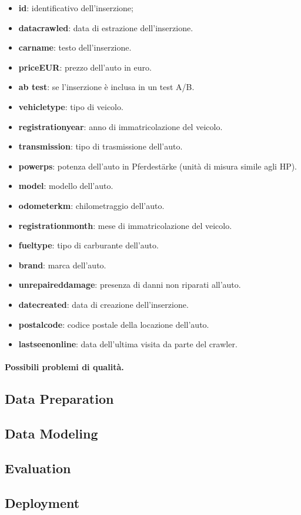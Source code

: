 \begin{itemize}
    \item \textbf{id}: identificativo dell'inserzione;
    \item \textbf{data\textunderscore crawled}: data di estrazione dell'inserzione.
    \item \textbf{car\textunderscore name}: testo dell'inserzione.
    \item \textbf{price\textunderscore EUR}: prezzo dell'auto in euro.
    \item \textbf{ab \textunderscore test}: se l'inserzione è inclusa in un test A/B.
    \item \textbf{vehicle\textunderscore type}: tipo di veicolo.
    \item \textbf{registration\textunderscore year}: anno di immatricolazione del veicolo.
    \item \textbf{transmission}: tipo di trasmissione dell'auto.
    \item \textbf{power\textunderscore ps}: potenza dell'auto in Pferdestärke (unità di misura simile agli HP).
    \item \textbf{model}: modello dell'auto. 
    \item \textbf{odometer\textunderscore km}: chilometraggio dell'auto.
    \item\textbf{registration\textunderscore month}: mese di immatricolazione del veicolo.
    \item \textbf{fuel\textunderscore type}: tipo di carburante dell'auto.
    \item \textbf{brand}: marca dell'auto.
    \item \textbf{unrepaired\textunderscore damage}: presenza di danni non riparati all'auto.
    \item \textbf{date\textunderscore created}: data di creazione dell'inserzione.
    \item \textbf{postal\textunderscore code}: codice postale della locazione dell'auto.
    \item \textbf{last\textunderscore seen\textunderscore online}: data dell'ultima visita da parte del crawler.
\end{itemize}

\paragraph{Possibili problemi di qualità.}


\subsection{Data Preparation}

\subsection{Data Modeling}

\subsection{Evaluation}

\subsection{Deployment}